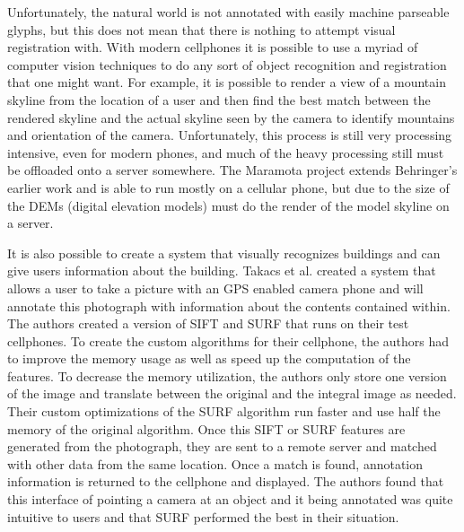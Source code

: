 \documentclass{acm_proc_article-sp}
\begin{document}
Unfortunately, the natural world is not annotated with easily machine parseable glyphs, but this does not mean that there is nothing to attempt visual registration with.  With modern cellphones it is possible to use a myriad of computer vision techniques to do any sort of object recognition and registration that one might want.   For example, it is possible to render a view of a mountain skyline from the location of a user and then find the best match between the rendered skyline and the actual skyline seen by the camera to identify mountains and orientation of the camera. \cite{behringer2002registration}  Unfortunately, this process is still very processing intensive, even for modern phones, and much of the heavy processing still must be offloaded onto a server somewhere.  The Maramota project extends Behringer's earlier work and is able to run mostly on a cellular phone, but due to the size of the DEMs (digital elevation models) must do the render of the model skyline on a server. \cite{chippendale2009environmental}

It is also possible to create a system that visually recognizes buildings and can give users information about the building. Takacs et al. created a system that allows a user to take a picture with an GPS enabled camera phone and will annotate this photograph with information about the contents contained within.  The authors created a version of SIFT \cite{lowe1999object} and SURF \cite{bay2006surf} that runs on their test cellphones.  To create the custom algorithms for their cellphone, the authors had to improve the memory usage as well as speed up the computation of the features. To decrease the memory utilization, the authors only store one version of the image and translate between the original and the integral image as needed.  Their custom optimizations of the SURF algorithm run faster and use half the memory of the original algorithm.  Once this SIFT or SURF features are generated from the photograph, they are sent to a remote server and matched with other data from the same location.  Once a match is found, annotation information is returned to the cellphone and displayed.  The authors found that this interface of pointing a camera at an object and it being annotated was quite intuitive to users and that SURF performed the best in their situation.  \cite{takacs2008outdoors}
\end{document}
